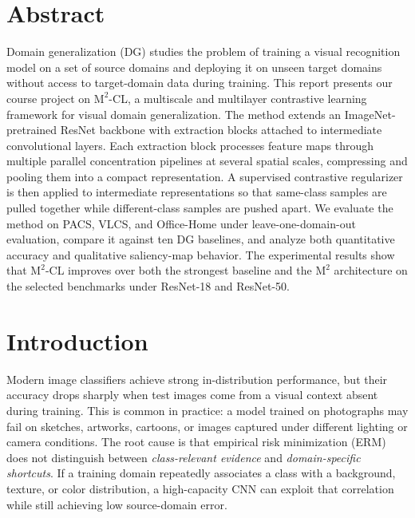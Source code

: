 \documentclass[11pt,a4paper]{article}
\newcommand{\method}{\texorpdfstring{$\mathrm{M}^2$\textup{-CL}}{M2-CL}}
\newcommand{\base}{\texorpdfstring{$\mathrm{M}^2$}{M2}}
\begin{document}
\tableofcontents
\newpage
{}

\section*{Abstract}
\noindent\colorbox{hustbluelight}{%
  \begin{minipage}{\dimexpr\textwidth-2\fboxsep\relax}
    \vspace{6pt}\small
    Domain generalization (DG) studies the problem of training a visual recognition
    model on a set of source domains and deploying it on unseen target domains
    without access to target-domain data during training.
    This report presents our course project on \method{}, a multiscale and
    multilayer contrastive learning framework for visual domain generalization.
    The method extends an ImageNet-pretrained ResNet backbone with extraction blocks
    attached to intermediate convolutional layers.  Each extraction block processes
    feature maps through multiple parallel concentration pipelines at several spatial
    scales, compressing and pooling them into a compact representation.  A supervised
    contrastive regularizer is then applied to intermediate representations so that
    same-class samples are pulled together while different-class samples are pushed
    apart.
    We evaluate the method on PACS, VLCS, and Office-Home under leave-one-domain-out
    evaluation, compare it against ten DG baselines, and analyze both quantitative
    accuracy and qualitative saliency-map behavior.  The experimental results show
    that \method{} improves over both the strongest baseline and the \base{}
    architecture on the selected benchmarks under ResNet-18 and ResNet-50.
    \vspace{6pt}
  \end{minipage}}
\vspace{1em}

\section{Introduction}

Modern image classifiers achieve strong in-distribution performance, but their
accuracy drops sharply when test images come from a visual context absent during
training.  This is common in practice: a model trained on photographs may fail on
sketches, artworks, cartoons, or images captured under different lighting or camera
conditions.  The root cause is that empirical risk minimization (ERM) does not
distinguish between \emph{class-relevant evidence} and \emph{domain-specific
shortcuts}.  If a training domain repeatedly associates a class with a background,
texture, or color distribution, a high-capacity CNN can exploit that correlation
while still achieving low source-domain error.
\end{document}
